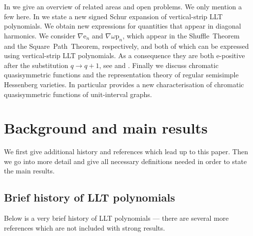 \documentclass[reqno]{amsart}
\newcommand{\elementaryE}{\mathrm{e}}
\newcommand{\powerSum}{\mathrm{p}}
\begin{document}
In  we give an overview of related areas and open problems.
We only mention a few here. 
In  we state a new signed Schur expansion of vertical-strip LLT polynomials.
We obtain new expressions for quantities that appear in diagonal harmonics.
We consider $\nabla \elementaryE_n$ and $\nabla \omega \powerSum_n$,
which appear in the Shuffle~Theorem and the Square~Path~Theorem, respectively, and both of which can be expressed using vertical-strip LLT polynomials.
As a consequence they are both $\elementaryE$-positive after the substitution $q \to q+1$,
see  and .
Finally we discuss chromatic quasisymmetric functions and the 
representation theory of regular semisimple Hessenberg varieties.
In particular  provides a new characterisation 
of chromatic quasisymmetric functions of unit-interval graphs.



\section{Background and main results}
\label{Section:background}

We first give additional history and references which lead up to this paper.
Then we go into more detail and give all necessary 
definitions needed in order to state the main results.

\subsection{Brief history of LLT polynomials}

Below is a very brief history of LLT polynomials --- there are
several more references which are not included with strong results.
\end{document}
